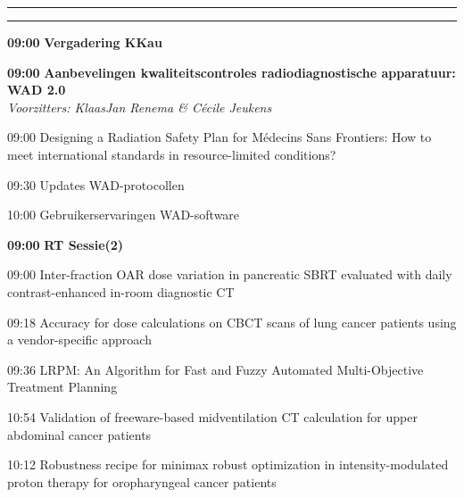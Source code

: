 \documentclass[a4paper,10pt]{report}
\begin{document}
\begin{multicols*}{3}
\strut
\columnbreak

\hrule\vspace{2mm}
\vspace{2mm}\hrule\strut


\begin{packed_enum}
\item[\textbf{09:00}] \textbf{Vergadering KKau}
\end{packed_enum} %

\vfill

\begin{packed_enum}
\item[\textbf{09:00}] \textbf{Aanbevelingen kwaliteitscontroles radiodiagnostische apparatuur: WAD 2.0}\\\textit{Voorzitters: KlaasJan Renema \& Cécile Jeukens}
\item[09:00] Designing a Radiation Safety Plan for Médecins Sans Fron\-tiers: How to meet international standards in resource-limited conditions?
\item[09:30] Updates WAD-protocollen
\item[10:00] Gebruikerservaringen WAD-software
\end{packed_enum} %

\vfill

\begin{packed_enum}
\item[\textbf{09:00}]{\textbf{RT Sessie(2)}}
\item[09:00] Inter-fraction OAR dose variation in pancreatic SBRT eval\-uated with daily contrast-enhanced in-room diagnostic CT
\item[09:18] Accuracy for dose calculations on CBCT scans of lung cancer patients using a vendor-specific approach
\item[09:36] LRPM: An Algorithm for Fast and Fuzzy Automated Multi-Objective Treatment Planning
\item[10:54] Validation of freeware-based midventilation CT calculation for upper abdominal cancer patients
\item[10:12] Robustness recipe for minimax robust optimization in in\-ten\-sity-modulated proton therapy for oropharyngeal can\-cer patients
\end{packed_enum} %


\end{multicols*}
\end{document}
